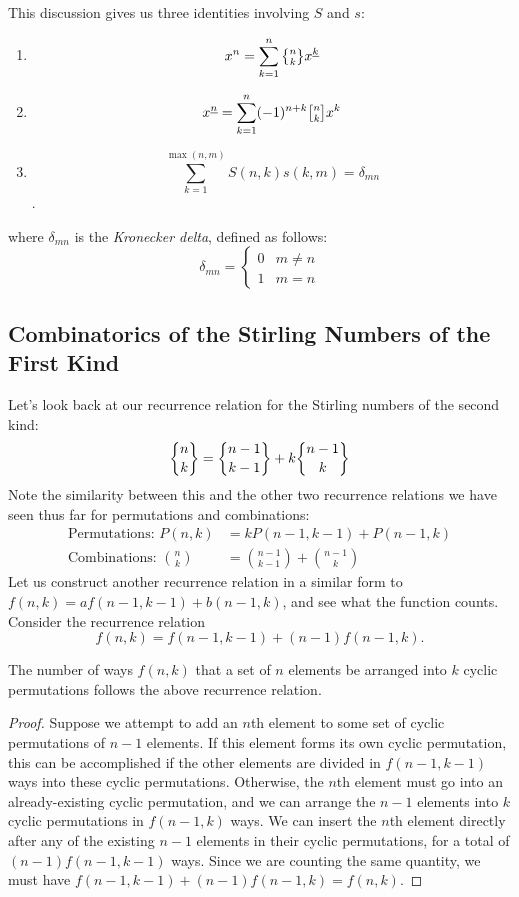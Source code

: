This discussion gives us three identities involving $S$ and $s$: 
\begin{enumerate}
	\item \[ x^n = \sum_{k=1}^{n} \stirii{n}{k} \ff{x}{k} \] %
	\item \[ \ff{x}{n} = \sum_{k=1}^{n} (-1)^{n+k} \stiri{n}{k} x^k \] %
	\item \[ \sum_{k=1}^{\max(n, m)} S(n, k) s(k, m) = \delta_{mn} \].
\end{enumerate}
where $\delta_{mn}$ is the \textit{Kronecker delta}, defined as follows: 
\[
	\delta_{mn} = \begin{cases}
		0 & m \neq n \\
		1 & m = n
	\end{cases}
\]


\subsection{Combinatorics of the Stirling Numbers of the First Kind}
Let's look back at our recurrence relation for the Stirling numbers of the second kind: 
\[
	\dstirii{n}{k} = \dstirii{n-1}{k-1} + k \dstirii{n-1}{k}
\]
Note the similarity between this and the other two recurrence relations we have seen thus far for permutations and combinations: 
\begin{align*}
	\text{Permutations: } P(n, k) &= k P(n-1, k-1) + P(n-1, k) \\
	\text{Combinations: } \binom{n}{k} &= \binom{n-1}{k-1} + \binom{n-1}{k} 
\end{align*}
Let us construct another recurrence relation in a similar form to $f(n, k) = af(n-1, k-1) + b(n-1, k)$, and see what the function counts. Consider the recurrence relation 
\[
	f(n, k) = f(n-1, k-1) + (n-1) f(n-1, k).
\]
\begin{proposition}{1}
The number of ways $f(n, k)$ that a set of $n$ elements be arranged into $k$ cyclic permutations follows the above recurrence relation. 
\end{proposition}

\begin{proof}
	Suppose we attempt to add an $n$th element to some set of cyclic permutations of $n-1$ elements. If this element forms its own cyclic permutation, this can be accomplished if the other elements are divided in $f(n-1, k-1)$ ways into these cyclic permutations. Otherwise, the $n$th element must go into an already-existing cyclic permutation, and we can arrange the $n-1$ elements into $k$ cyclic permutations in $f(n-1, k)$ ways. We can insert the $n$th element directly after any of the existing $n-1$ elements in their cyclic permutations, for a total of $(n-1)f(n-1, k-1)$ ways. Since we are counting the same quantity, we must have $f(n-1, k-1) + (n-1)f(n-1, k) = f(n, k)$. 
\end{proof}

